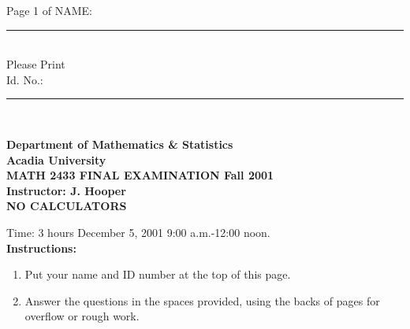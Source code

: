 \documentclass[12pt]{article}
\title{}\date{}
\begin{document}
\thispagestyle{empty}

\noindent
Page 1 of \pageref{`last'} \hfill NAME: \rule{2in}{.1mm} \\
\mbox{} \hfill Please Print \hspace{1in}\\

\mbox{} \hfill Id. No.: \rule{2in}{.1mm}  \\

 \begin{center}

{\large \bf Department of Mathematics \& Statistics \\ [2mm]
Acadia University\\ [2mm]
MATH 2433 \hfill  FINAL EXAMINATION  \hfill Fall 2001\\  [3mm]
Instructor:  J. Hooper \\ [3mm]
NO CALCULATORS}

 \end{center}
\noindent
Time: 3 hours \hfill  December 5, 2001  \hfill 9:00 a.m.-12:00 noon.
 \\

\noindent
{\bf Instructions:}

 \begin{enumerate}

 \item
Put your name and ID number at the top of this page.

 \item
Answer the questions in the spaces provided, using the backs of pages for
overflow or rough work.

 \end{enumerate}
\end{document}

